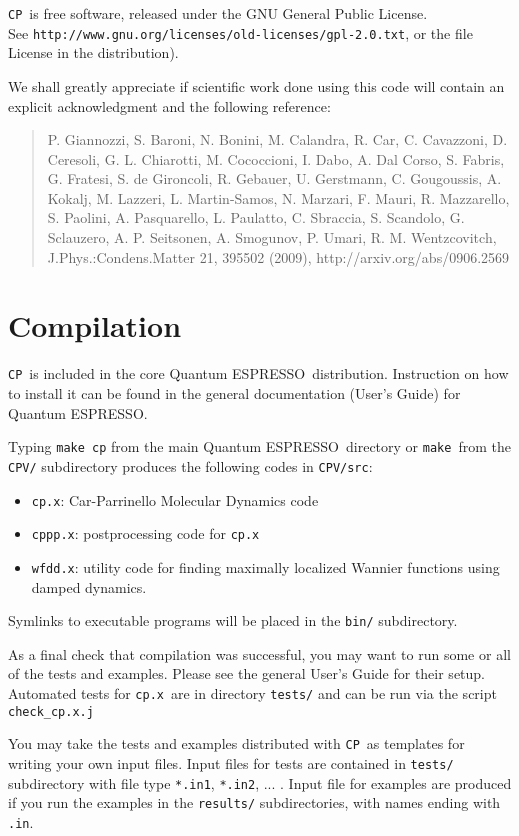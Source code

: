 \documentclass[12pt,a4paper]{article}
\def\qe{{\sc Quantum ESPRESSO}}
\def\cpx{\texttt{cp.x}}
\def\CP{\texttt{CP}}
\def\make{\texttt{make}}
\begin{document}
\CP\ is free software, released under the
GNU General Public License. \\ See
\texttt{http://www.gnu.org/licenses/old-licenses/gpl-2.0.txt},
or the file License in the distribution).

We shall greatly appreciate if scientific work done using this code will
contain an explicit acknowledgment and the following reference:
\begin{quote}
P. Giannozzi, S. Baroni, N. Bonini, M. Calandra, R. Car, C. Cavazzoni,
D. Ceresoli, G. L. Chiarotti, M. Cococcioni, I. Dabo, A. Dal Corso,
S. Fabris, G. Fratesi, S. de Gironcoli, R. Gebauer, U. Gerstmann,
C. Gougoussis, A. Kokalj, M. Lazzeri, L. Martin-Samos, N. Marzari,
F. Mauri, R. Mazzarello, S. Paolini, A. Pasquarello, L. Paulatto,
C. Sbraccia, S. Scandolo, G. Sclauzero, A. P. Seitsonen, A. Smogunov,
P. Umari, R. M. Wentzcovitch, J.Phys.:Condens.Matter 21, 395502 (2009),
http://arxiv.org/abs/0906.2569
\end{quote}

\section{Compilation}

\CP\ is included in the core \qe\ distribution.
Instruction on how to install it can be found in the
general documentation (User's Guide) for \qe.

Typing \texttt{make cp} from the main \qe\ directory
or \make\ from the \texttt{CPV/} subdirectory produces the following codes in \texttt{CPV/src}:
\begin{itemize}
\item \cpx: Car-Parrinello Molecular Dynamics
code
\item \texttt{cppp.x}: postprocessing code for \cpx
\item \texttt{wfdd.x}: utility code for finding maximally
localized Wannier functions using damped dynamics.
\end{itemize}
Symlinks to executable programs will be placed in the \texttt{bin/} subdirectory. 

As a final check that compilation was successful,
you may want to run some or all of the tests
and examples. Please see the general User's Guide for their setup. Automated tests for \cpx\ are in directory 
\texttt{tests/} and can be run via the
script \texttt{check\_cp.x.j}

You may take the tests and examples distributed 
with \CP\ as templates for writing your own input
files. Input files for tests are contained
in \texttt{tests/} subdirectory with file type 
\texttt{*.in1}, \texttt{*.in2}, ... . Input file for examples
are produced if you run the examples in the 
\texttt{results/} subdirectories, with names ending
with \texttt{.in}.
\end{document}
